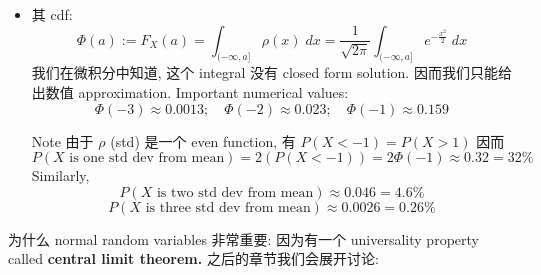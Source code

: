 \begin{itemize}
从而: \[
\text{Var}(X) = 1
\]



For general normally distributed $Y$, 我们知道了 $X : = \frac{Y - \mu}{\sigma}$ 的 $\mathbb{E}[X]  = 0$, $\text{Var}(X) = 1$, 因而 \[
\mathbb{E}[Y] = \mathbb{E}[\sigma X + \mu]   = \mu
\]
and
\[
\text{Var}(Y)  = \text{Var}(\sigma X + \mu) =  \mathbb{E}[(\sigma X + \mu - \mu)^2] = \mathbb{E} (\sigma^2 X^2) = \sigma^2 \mathbb{E}[X^2] = \sigma^2 
\]

对于多个 i.i.d. normally distributed $X$, 
    \[ \mathbb{E}[X^k] =  \frac{1}{\sqrt{2\pi}} \int_\mathbb{R} x^k  e^{-\frac{x^2}{2}}  \; dx  \]
    For $k$ odd, it is $0$.\\
    For $k$ even:
  \begin{align*}
      \mathbb{E}[X^k] &=  \frac{1}{\sqrt{2\pi}} \int_\mathbb{R} x^{k-1} (x e^{-\frac{x^2}{2}})  \; dx  \\
      & = -\frac{1}{\sqrt{2\pi}} \int_\mathbb{R} x^{k-1} ( e^{-\frac{x^2}{2}}) ' \; dx \\
      &= 0 + \frac{1}{\sqrt{2\pi}} \int_\mathbb{R} (x^{k-1})' e^{-\frac{x^2}{2}} \;dx \\
      & = \frac{k-1}{\sqrt{2\pi}} \int_\mathbb{R} x^{k-2} e^{-\frac{x^2}{2}} \;dx  \\
      & = (k-1) \mathbb{E}[X^{k-2}]
   \end{align*}
   从而: \[
   \mathbb{E}[X^k] = \begin{cases}
       0 ,\quad k = 2j-1 \\
       (2j-1)(2j-3)\cdots 1 = \frac{(2j)!}{2^j j!},\quad k=2j
   \end{cases}
   \]

\item 其 cdf: 
 \[
\Phi(a) :=F_X(a)  = \int_{(-\infty,a]} \rho(x) \; dx = \frac{1}{\sqrt{2\pi}} \int_{(-\infty,a]}  e^{-\frac{x^2}{2}} \; dx
\]
我们在微积分中知道, 这个 integral 没有 closed form solution.
因而我们只能给出数值 approximation. Important numerical values:
\[
\Phi(-3) \approx 0.0013; \quad \Phi(-2) \approx 0.023; \quad \Phi(-1) \approx 0.159
\] 


Note 由于 $\rho$ (std) 是一个 even function, 有 \(P(X < -1) = P(X>1)\)
因而 \[
P(X \text{ is one std dev from mean}) = 2(P(X < -1)) = 2 \Phi(-1) \approx0.32 = 32\%
\]
Similarly, \[
P(X \text{ is two std dev from mean}) \approx 0.046 = 4.6\%
\]\[
P(X \text{ is three std dev from mean}) \approx 0.0026 = 0.26\%
\]
\end{itemize}


为什么 normal random variables 非常重要: 因为有一个
universality property called \textbf{central limit theorem.} 之后的章节我们会展开讨论:
